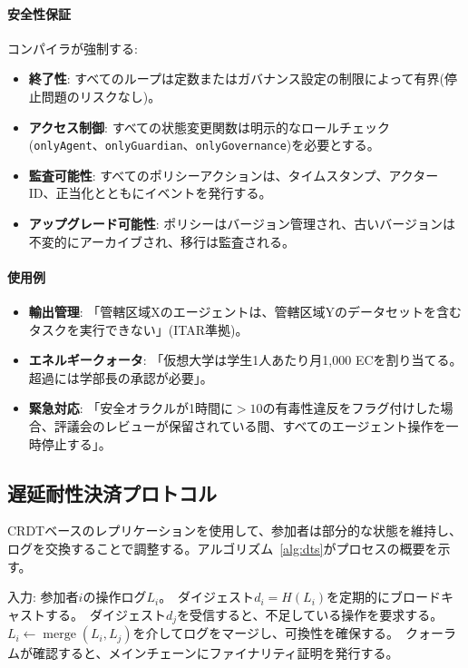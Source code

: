 \documentclass[11pt]{article}
\begin{document}
\paragraph{安全性保証} コンパイラが強制する:
\begin{itemize}[noitemsep]
  \item \textbf{終了性}: すべてのループは定数またはガバナンス設定の制限によって有界(停止問題のリスクなし)。
  \item \textbf{アクセス制御}: すべての状態変更関数は明示的なロールチェック(\texttt{onlyAgent}、\texttt{onlyGuardian}、\texttt{onlyGovernance})を必要とする。
  \item \textbf{監査可能性}: すべてのポリシーアクションは、タイムスタンプ、アクターID、正当化とともにイベントを発行する。
  \item \textbf{アップグレード可能性}: ポリシーはバージョン管理され、古いバージョンは不変的にアーカイブされ、移行は監査される。
\end{itemize}

\paragraph{使用例}
\begin{itemize}[noitemsep]
  \item \textbf{輸出管理}: 「管轄区域Xのエージェントは、管轄区域Yのデータセットを含むタスクを実行できない」(ITAR準拠)。
  \item \textbf{エネルギークォータ}: 「仮想大学は学生1人あたり月1,000 ECを割り当てる。超過には学部長の承認が必要」。
  \item \textbf{緊急対応}: 「安全オラクルが1時間に$>10$の有毒性違反をフラグ付けした場合、評議会のレビューが保留されている間、すべてのエージェント操作を一時停止する」。
\end{itemize}

\subsection{遅延耐性決済プロトコル}
CRDTベースのレプリケーションを使用して、参加者は部分的な状態を維持し、ログを交換することで調整する。アルゴリズム~\ref{alg:dts}がプロセスの概要を示す。

\begin{algorithm}[H]
  \caption{遅延耐性決済(DTS)}
  \label{alg:dts}
  \begin{algorithmic}[1]
    \STATE 入力: 参加者$i$の操作ログ$L_i$。\
    \STATE ダイジェスト$d_i = H(L_i)$を定期的にブロードキャストする。\
    \STATE ダイジェスト$d_j$を受信すると、不足している操作を要求する。\
    \STATE $L_i \leftarrow \operatorname{merge}(L_i, L_j)$を介してログをマージし、可換性を確保する。\
    \STATE クォーラムが確認すると、メインチェーンにファイナリティ証明を発行する。\
  \end{algorithmic}
\end{algorithm}
\end{document}
